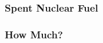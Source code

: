 
\begin{frame}[ctb!]
  \frametitle{Spent Nuclear Fuel}
  
\end{frame}

\begin{frame}[ctb!]
  \frametitle{How Much?}
  
\end{frame}

